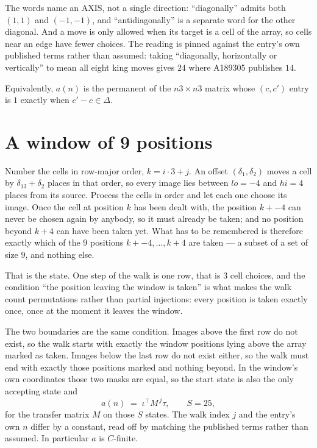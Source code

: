 \documentclass[11pt,a4paper]{article}
\theoremstyle{plain}
\theoremstyle{definition}
\begin{document}
The words name an AXIS, not a single direction: ``diagonally'' admits
both $(1,1)$ and $(-1,-1)$, and ``antidiagonally'' is a separate word for the other diagonal.
And a move is only allowed when its target is a cell of the array, so cells near an
edge have fewer choices. The reading is pinned against the entry's own published terms rather
than assumed: taking ``diagonally, horizontally or vertically'' to mean all eight king moves
gives $24$ where A189305 publishes $14$.

Equivalently, $a(n)$ is the permanent of the $n3\times n3$ matrix whose $(c,c')$ entry is
$1$ exactly when $c'-c\in\Delta$.

\section{A window of 9 positions}

Number the cells in row-major order, $k=i\cdot3+j$. An offset $(\delta_1,\delta_2)$ moves a
cell by $\delta_13+\delta_2$ places in that order, so every image lies between $lo=-4$ and
$hi=4$ places from its source. Process the cells in order and let each one choose its image.
Once the cell at position $k$ has been dealt with, the position $k+-4$ can never be chosen
again by anybody, so it must already be taken; and no position beyond $k+4$ can have been
taken yet. What has to be remembered is therefore exactly which of the $9$ positions
$k+-4,\dots,k+4$ are taken --- a subset of a set of size $9$, and nothing else.

That is the state. One step of the walk is one row, that is $3$ cell choices, and the
condition ``the position leaving the window is taken'' is what makes the walk count permutations
rather than partial injections: every position is taken exactly once, once at the moment it
leaves the window.

The two boundaries are the same condition. Images above the first row do not exist, so the walk
starts with exactly the window positions lying above the array marked as taken. Images below the
last row do not exist either, so the walk must end with exactly those positions marked and
nothing beyond. In the window's own coordinates those two masks are equal, so the start state is
also the only accepting state and
\[
a(n)\;=\;\iota^{\!\top}M^{\,j}\tau ,\qquad S=25,
\]
for the transfer matrix $M$ on those $S$ states. The walk index $j$ and the entry's own $n$
differ by a constant, read off by matching the published terms rather than assumed. In
particular $a$ is $C$-finite.
\end{document}
